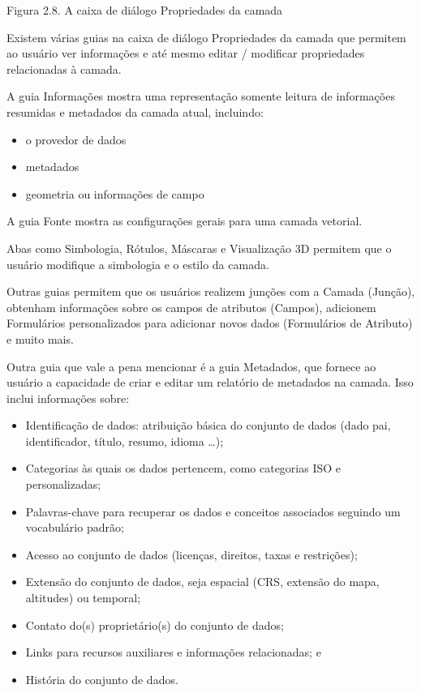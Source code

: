 \documentclass[
]{krantz}
\providecommand{\tightlist}{%
  \setlength{\itemsep}{0pt}\setlength{\parskip}{0pt}}
\begin{document}
Figura 2.8. A caixa de diálogo Propriedades da camada

Existem várias guias na caixa de diálogo Propriedades da camada que permitem ao usuário ver informações e até mesmo editar / modificar propriedades relacionadas à camada.

A guia Informações mostra uma representação somente leitura de informações resumidas e metadados da camada atual, incluindo:

\begin{itemize}
\tightlist
\item
  o provedor de dados
\item
  metadados
\item
  geometria ou informações de campo
\end{itemize}

A guia Fonte mostra as configurações gerais para uma camada vetorial.

Abas como Simbologia, Rótulos, Máscaras e Visualização 3D permitem que o usuário modifique a simbologia e o estilo da camada.

Outras guias permitem que os usuários realizem junções com a Camada (Junção), obtenham informações sobre os campos de atributos (Campos), adicionem Formulários personalizados para adicionar novos dados (Formulários de Atributo) e muito mais.

Outra guia que vale a pena mencionar é a guia Metadados, que fornece ao usuário a capacidade de criar e editar um relatório de metadados na camada. Isso inclui informações sobre:

\begin{itemize}
\tightlist
\item
  Identificação de dados: atribuição básica do conjunto de dados (dado pai, identificador, título, resumo, idioma \ldots);
\item
  Categorias às quais os dados pertencem, como categorias ISO e personalizadas;
\item
  Palavras-chave para recuperar os dados e conceitos associados seguindo um vocabulário padrão;
\item
  Acesso ao conjunto de dados (licenças, direitos, taxas e restrições);
\item
  Extensão do conjunto de dados, seja espacial (CRS, extensão do mapa, altitudes) ou temporal;
\item
  Contato do(s) proprietário(s) do conjunto de dados;
\item
  Links para recursos auxiliares e informações relacionadas; e
\item
  História do conjunto de dados.
\end{itemize}
\end{document}
